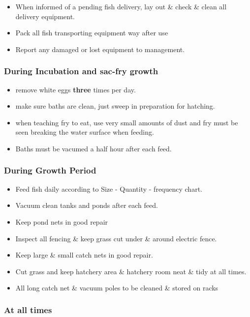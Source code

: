 \begin{itemize}
\item When informed of a pending fish delivery, lay out \& check \& clean all delivery equipment.
\item Pack all fish transporting equipment way after use 
\item Report any damaged or lost equipment to management.
\end{itemize}


\subsubsection{During Incubation and sac-fry growth}

\begin{itemize}
\item remove white eggs {\bf three} times per day.
\item make sure baths are clean, just sweep in preparation for hatching.
\item when teaching fry to eat, use very small amounts of dust and fry must be seen breaking the water surface when feeding.
\item Baths must be vacumed a half hour after each feed.
\end{itemize}

\subsubsection{During Growth Period}

\begin{itemize}
\item Feed fish daily according to Size - Quantity - frequency chart.
\item Vacuum clean tanks and ponds after each feed.
\item Keep pond nets in good repair
\item Inspect all fencing \& keep grass cut under \& around electric fence.
\item Keep large \& small catch nets in good repair.
\item Cut grass and keep hatchery area \& hatchery room neat \& tidy at all times.
\item All long catch net \& vacuum poles to be cleaned \& stored on racks
\end{itemize}

\subsubsection{At all times}

